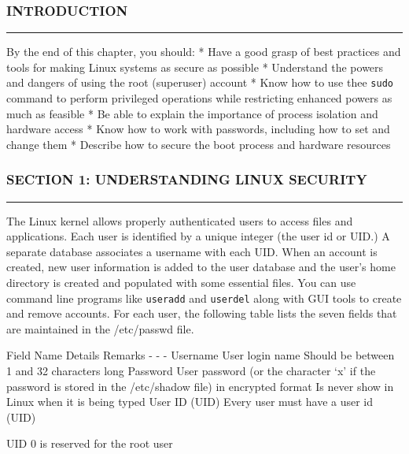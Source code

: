 \subsubsection{INTRODUCTION}\label{introduction-10}

\begin{center}\rule{3in}{0.4pt}\end{center}

By the end of this chapter, you should: * Have a good grasp of best
practices and tools for making Linux systems as secure as possible *
Understand the powers and dangers of using the root (superuser) account
* Know how to use thee \texttt{sudo} command to perform privileged
operations while restricting enhanced powers as much as feasible * Be
able to explain the importance of process isolation and hardware access
* Know how to work with passwords, including how to set and change them
* Describe how to secure the boot process and hardware resources

\subsubsection{SECTION 1: UNDERSTANDING LINUX
SECURITY}\label{section-1-understanding-linux-security}

\begin{center}\rule{3in}{0.4pt}\end{center}

The Linux kernel allows properly authenticated users to access files and
applications. Each user is identified by a unique integer (the user id
or UID.) A separate database associates a username with each UID. When
an account is created, new user information is added to the user
database and the user's home directory is created and populated with
some essential files. You can use command line programs like
\texttt{useradd} and \texttt{userdel} along with GUI tools to create and
remove accounts. For each user, the following table lists the seven
fields that are maintained in the /etc/passwd file.

Field Name \textbar{} Details \textbar{} Remarks - \textbar{} -
\textbar{} - Username \textbar{} User login name \textbar{} Should be
between 1 and 32 characters long Password \textbar{} User password (or
the character `x' if the password is stored in the /etc/shadow file) in
encrypted format \textbar{} Is never show in Linux when it is being
typed User ID (UID) \textbar{} Every user must have a user id (UID)
\textbar{}

UID 0 is reserved for the root user


